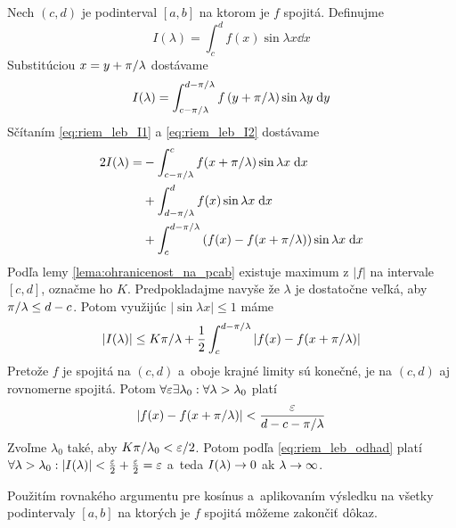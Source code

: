 \begin{dokaz}
    Nech $(c,d)$ je podinterval $[a,b]$ na ktorom je $f$ spojitá.
    Definujme 
    \begin{equation}
        I(\lambda) = \int_c^d f(x) \sin \lambda x \dd x
        \label{eq:riem_leb_I1}
    \end{equation}
    Substitúciou $x=y+\pi/\lambda$ dostávame
    \begin{equation}
        I(\lambda) = \int_{c-\pi/\lambda}^{d-\pi/\lambda}
            f \left(y+\pi/\lambda\right) \sin \lambda y \; \mathrm{d} y
        \label{eq:riem_leb_I2}
    \end{equation}
%
    Sčítaním \eqref{eq:riem_leb_I1} a \eqref{eq:riem_leb_I2} dostávame
    \begin{equation*}
    \begin{split}
        2I(\lambda) =&-\int_{c-\pi/\lambda}^c f(x+\pi/\lambda) \sin \lambda x \; \mathrm{d} x 
                \\ &+
                \int_{d-\pi/\lambda}^d f(x) \sin \lambda x \; \mathrm{d} x \\
                &+
                \int_c^{d-\pi/\lambda} \left( 
                    f(x) - f(x+\pi/\lambda)
                    \right) \sin \lambda x \; \mathrm{d} x
    \end{split}
    \end{equation*}
    Podľa lemy \ref{lema:ohranicenost_na_pcab} existuje maximum z
    $|f|$ na intervale $[c,d]$, označme ho $K$.
    Predpokladajme navyše že $\lambda$ je dostatočne veľká, aby
    $\pi/\lambda \le d-c$. Potom využijúc $|\sin \lambda x|\le1$ máme
    \begin{equation}
        |I(\lambda)| \le K \pi/\lambda + \frac{1}{2} \int_c^{d-\pi/\lambda}
            \left|f(x) - f(x+\pi/\lambda)\right|
        \label{eq:riem_leb_odhad}
    \end{equation}
    Pretože $f$ je spojitá na $(c,d)$ a~oboje krajné limity sú konečné,
    je na $(c,d)$ aj rovnomerne spojitá. 
    Potom $\forall \varepsilon \exists \lambda_0: \forall \lambda>\lambda_0$
    platí
    \begin{equation*}
        |f(x) - f(x+\pi/\lambda)| < \frac{\varepsilon}{d-c-\pi/\lambda}
    \end{equation*}
    Zvoľme $\lambda_0$ také, aby $K \pi/\lambda_0 < \varepsilon/2$.
    Potom podľa \eqref{eq:riem_leb_odhad} platí 
    $\forall \lambda>\lambda_0: 
        |I(\lambda)|<\frac{\varepsilon}{2} + \frac{\varepsilon}{2} = \varepsilon$ a~teda 
    $I(\lambda)\rightarrow0$ ak $\lambda\rightarrow\infty$.
    
    Použitím rovnakého argumentu pre kosínus a~aplikovaním výsledku 
    na všetky podintervaly $[a,b]$ na ktorých je $f$ spojitá môžeme
    zakončiť dôkaz.
\end{dokaz}

